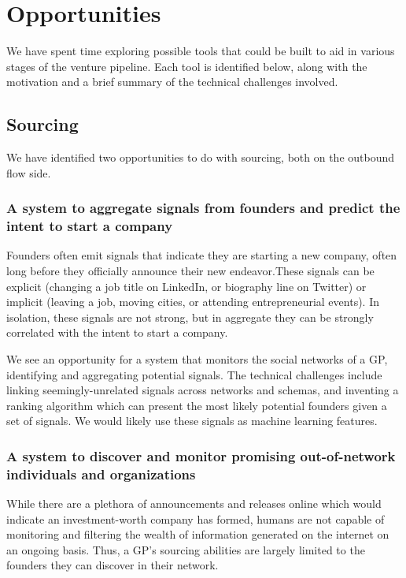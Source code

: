 \section{Opportunities}

We have spent time exploring possible tools that could be built to aid in various stages of the venture pipeline. Each tool is identified below, along with the motivation and a brief summary of the technical challenges involved.

\subsection{Sourcing}

We have identified two opportunities to do with sourcing, both on the outbound flow side.

\subsubsection{A system to aggregate signals from founders and predict the intent to start a company}

Founders often emit signals that indicate they are starting a new company, often long before they officially announce their new endeavor.These signals can be explicit (changing a job title on LinkedIn, or biography line on Twitter) or implicit (leaving a job, moving cities, or attending entrepreneurial events). In isolation, these signals are not strong, but in aggregate they can be strongly correlated with the intent to start a company.

We see an opportunity for a system that monitors the social networks of a GP, identifying and aggregating potential signals. The technical challenges include linking seemingly-unrelated signals across networks and schemas, and inventing a ranking algorithm which can present the most likely potential founders given a set of signals. We would likely use these signals as machine learning features.

\subsubsection{A system to discover and monitor promising out-of-network individuals and organizations}

While there are a plethora of announcements and releases online which would indicate an investment-worth company has formed, humans are not capable of monitoring and filtering the wealth of information generated on the internet on an ongoing basis. Thus, a GP's sourcing abilities are largely limited to the founders they can discover in their network.

